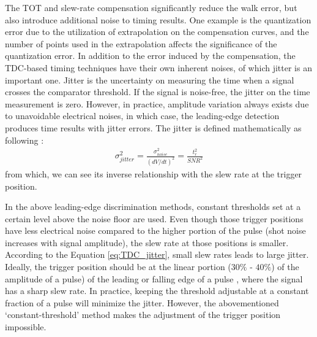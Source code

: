 The TOT and slew-rate compensation significantly reduce the walk error, but also introduce additional noise to timing results. One example is the quantization error due to the utilization of extrapolation on the compensation curves, and the number of points used in the extrapolation affects the significance of the quantization error. In addition to the error induced by the compensation, the TDC-based timing techniques have their own inherent noises, of which jitter is an important one. Jitter is the uncertainty on measuring the time when a signal crosses the comparator threshold. If the signal is noise-free, the jitter on the time measurement is zero. However, in practice, amplitude variation always exists due to unavoidable electrical noises, in which case, the leading-edge detection produces time results with jitter errors. The jitter is defined mathematically as following \citep{skolnik1962introduction}:
\begin{align} \label{eq:TDC_jitter}
    \sigma^2_{jitter}=\frac{\sigma^2_{noise}}{(dV/dt)^2}=\frac{t^2_r}{SNR^2}
\end{align}
from which, we can see its inverse relationship with the slew rate at the trigger position.\par
In the above leading-edge discrimination methods, constant thresholds set at a certain level above the noise floor are used. Even though those trigger positions have less electrical noise compared to the higher portion of the pulse (shot noise increases with signal amplitude), the slew rate at those positions is smaller. According to the Equation \eqref{eq:TDC_jitter}, small slew rates leads to large jitter. Ideally, the trigger position should be at the linear portion ($30\%$ - $40\%$) of the amplitude of a pulse) of the leading or falling edge of a pulse \citep{kilpela1998timing}, where the signal has a sharp slew rate. In practice, keeping the threshold adjustable at a constant fraction of a pulse will minimize the jitter. However, the abovementioned ‘constant-threshold’ method makes the adjustment of the trigger position impossible.
